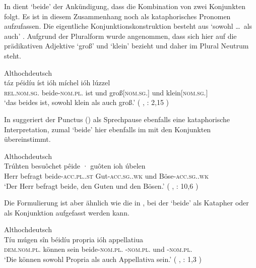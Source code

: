 
In  dient  `beide' der Ankündigung, dass die
Kombination von zwei Konjunkten folgt. Es ist in diesem Zusammenhang noch als
kataphorisches Pronomen aufzufassen. Die eigentliche
Konjunktionskonstruktion besteht aus  `sowohl \dots\ als
auch' \autocite[vgl.][169]{schuetzeichel2012}. Aufgrund der Pluralform wurde
angenommen, dass  sich hier auf die prädikativen
Adjektive  `groß' und  `klein'
bezieht und daher im Plural Neutrum steht.

\begin{exe}
\ex \label{ex:beidejohahd_1}
	\langinfo%
		{Althochdeutsch}%
		{}%
		{\cite[nach][57]{king1972}}\\
\gll táz péidíu íst ióh míchel ióh lúzzel \\
	\textsc{rel.nom.sg.\NeutI} beide-\textsc{nom.pl.\NeutI} ist und
	groß[\textsc{nom.sg.\NeutI}] und klein[\textsc{nom.sg.\NeutI}] \\
\trans `das beides ist, sowohl klein als auch groß.'
	(%
		, : 2,15%
	)
\end{exe}

In  suggeriert der Punctus () als Sprechpause
ebenfalls eine kataphorische Interpretation, zumal 
`beide' hier ebenfalls im  mit den Konjunkten übereinstimmt.

\begin{exe}
\ex \label{ex:beidejohahd_2}
	\langinfo%
		{Althochdeutsch}%
		{}%
		{\cite[nach][35]{tax1979}}\\
	\gll Trúhten besuôchet pêide · guôten ioh úbelen \\
		Herr befragt beide-\textsc{acc.pl.\MascA.st} {}
			Gut-\textsc{acc.sg.\MascA.wk} und
			Böse-\textsc{acc.sg.\MascA.wk} \\
	\trans `Der Herr befragt beide, den Guten und den Bösen.'
		(%
			, : 10,6%
		)
\end{exe}

Die Formulierung ist aber ähnlich wie die in , bei der
 `beide' als Katapher oder als Konjunktion aufgefasst
werden kann.

\begin{exe}
\ex \label{ex:beidejohahd_3}
	\langinfo%
		{Althochdeutsch}%
		{}%
		{\cite[nach][6]{king1972}}\\
	\gll Tíu múgen sîn béidíu propria ióh appellatiua \\
		\textsc{dem.nom.pl.\NeutI} können sein beide-\textsc{nom.pl.\NeutI}
			-\textsc{nom.pl.\NeutI} und
			-\textsc{nom.pl.\NeutI} \\
	\trans `Die können sowohl Propria als auch Appellativa sein.'
		(%
			, : 1,3%
		)
\end{exe}

